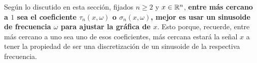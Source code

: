 \begin{nota}
\label{nota: la mejor frecuencia}
Según lo discutido en esta sección, fijados $n \geq 2$
y $x \in \mathbb{R}^{n}$, \textbf{entre más cercano a $1$ sea 
el coeficiente $\tau_{n}(x, \omega)$ o 
$\sigma_{n}(x, \omega)$, mejor es usar un sinusoide
de frecuencia $\omega$ para ajustar la gráfica de $x$}.
Esto porque, recuerde, entre más cercano a uno sea uno de
esos coeficientes, más cercana estará la señal $x$ a tener
la propiedad de ser una discretización de un sinusoide
de la respectiva frecuencia.
\end{nota}


